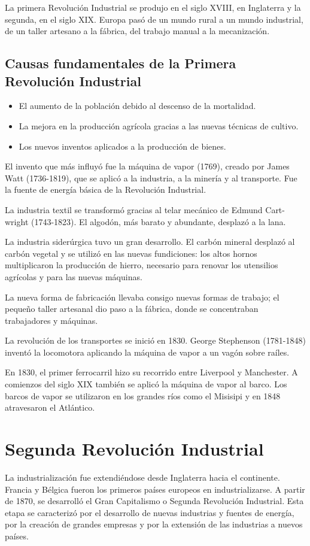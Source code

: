 \documentclass{article}
\begin{document}
  La primera Revolución Industrial se produjo en el siglo XVIII, en Inglaterra y la segunda, en el siglo XIX. Europa pasó de un mundo rural a un mundo industrial, de un taller artesano a la fábrica, del trabajo manual a la mecanización.

  \subsection*{Causas fundamentales de la Primera Revolución Industrial}

  \begin{itemize}
      \item El aumento de la población debido al descenso de la mortalidad.
      \item La mejora en la producción agrícola gracias a las nuevas técnicas de cultivo.
      \item Los nuevos inventos aplicados a la producción de bienes.
  \end{itemize}

  El invento que más influyó fue la máquina de vapor (1769), creado por James Watt (1736-1819), que se aplicó a la industria, a la minería y al transporte. Fue la fuente de energía básica de la Revolución Industrial.

  La industria textil se transformó gracias al telar mecánico de Edmund Cart-\\wright (1743-1823). El algodón, más barato y abundante, desplazó a la lana.

  La industria siderúrgica tuvo un gran desarrollo. El carbón mineral desplazó al carbón vegetal y se utilizó en las nuevas fundiciones: los altos hornos multiplicaron la producción de hierro, necesario para renovar los utensilios agrícolas y para las nuevas máquinas.

  La nueva forma de fabricación llevaba consigo nuevas formas de trabajo; el pequeño taller artesanal dio paso a la fábrica, donde se concentraban trabajadores y máquinas.

  La revolución de los transportes se inició en 1830. George Stephenson (1781-1848) inventó la locomotora aplicando la máquina de vapor a un vagón sobre raíles.

  En 1830, el primer ferrocarril hizo su recorrido entre Liverpool y Manchester. A comienzos del siglo XIX también se aplicó la máquina de vapor al barco. Los barcos de vapor se utilizaron en los grandes ríos como el Misisipi y en 1848 atravesaron el Atlántico.

  \section*{Segunda Revolución Industrial}
  La industrialización fue extendiéndose desde Inglaterra hacia el continente. Francia y Bélgica fueron los primeros países europeos en industrializarse. A partir de 1870, se desarrolló el Gran Capitalismo o Segunda Revolución Industrial. Esta etapa se caracterizó por el desarrollo de nuevas industrias y fuentes de energía, por la creación de grandes empresas y por la extensión de las industrias a nuevos países.
\end{document}
